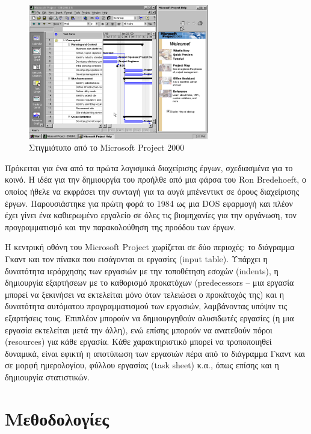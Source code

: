                \begin{figure}[H] \noindent \centering
                    \includegraphics[width=0.7\textwidth]{img/MicrosoftProject2000.png}
                    \caption{\centering Στιγμιότυπο από το Microsoft Project 2000 \cite{WinWorld}}
                \end{figure}
                
                Πρόκειται για ένα από τα πρώτα λογισμικά διαχείρισης έργων, σχεδιασμένα για το κοινό. Η ιδέα για την δημιουργία του προήλθε από μια φάρσα του Ron Bredehoeft, ο οποίος ήθελε να εκφράσει την συνταγή για τα αυγά μπένεντικτ σε όρους διαχείρισης έργων. Παρουσιάστηκε για πρώτη φορά το 1984 ως μια DOS εφαρμογή και πλέον έχει γίνει ένα καθιερωμένο εργαλείο σε όλες τις βιομηχανίες για την οργάνωση, τον προγραμματισμό και την παρακολούθηση της προόδου των έργων.
                
                Η κεντρική οθόνη του Microsoft Project χωρίζεται σε δύο περιοχές: το διάγραμμα Γκαντ και τον πίνακα που εισάγονται οι εργασίες (input table). Υπάρχει η δυνατότητα ιεράρχησης των εργασιών με την τοποθέτηση εσοχών (indents), η δημιουργία εξαρτήσεων με το καθορισμό προκατόχων (predecessors -- μια εργασία μπορεί να ξεκινήσει να εκτελείται μόνο όταν τελειώσει ο προκάτοχός της) και η δυνατότητα αυτόματου προγραμματισμού των εργασιών, λαμβάνοντας υπόψιν τις εξαρτήσεις τους. Επιπλέον μπορούν να δημιουργηθούν αλυσιδωτές εργασίες (η μια εργασία εκτελείται μετά την άλλη), ενώ επίσης μπορούν να ανατεθούν πόροι (resources) για κάθε εργασία. Κάθε χαρακτηριστικό μπορεί να τροποποιηθεί δυναμικά, είναι εφικτή η αποτύπωση των εργασιών πέρα από το διάγραμμα Γκαντ και σε μορφή ημερολογίου, φύλλου εργασίας (task sheet) κ.α., όπως επίσης και η δημιουργία στατιστικών.

                    
    \section{Μεθοδολογίες}
       
